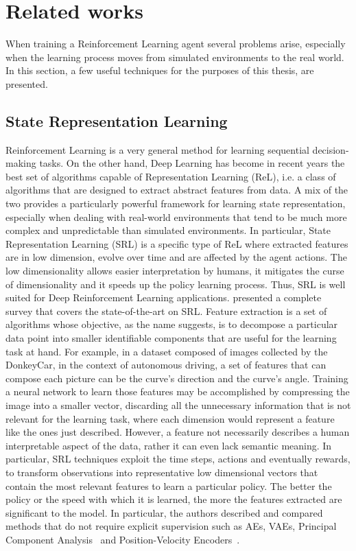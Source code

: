 \chapter{Related works}

When training a Reinforcement Learning agent several problems arise, especially when the learning process moves from simulated environments to the real world. In this section, a few useful techniques for the purposes of this thesis, are presented.

\section{State Representation Learning} \label{sec:srl}
Reinforcement Learning is a very general method for learning sequential decision-making tasks. On the other hand, Deep Learning has become in recent years the best set of algorithms capable of Representation Learning (ReL), i.e. a class of algorithms that are designed to extract abstract features from data. A mix of the two provides a particularly powerful framework for learning state representation, especially when dealing with real-world environments that tend to be much more complex and unpredictable than simulated environments. In particular, State Representation Learning (SRL) is a specific type of ReL where extracted features are in low dimension, evolve over time and are affected by the agent actions. The low dimensionality allows easier interpretation by humans, it mitigates the curse of dimensionality and it speeds up the policy learning process. Thus, SRL is well suited for Deep Reinforcement Learning applications. \citet{DBLP:journals/corr/abs-1802-04181} presented a complete survey that covers the state-of-the-art on SRL. Feature extraction is a set of algorithms whose objective, as the name suggests, is to decompose a particular data point into smaller identifiable components that are useful for the learning task at hand. For example, in a dataset composed of images collected by the DonkeyCar, in the context of autonomous driving, a set of features that can compose each picture can be the curve's direction and the curve's angle. Training a neural network to learn those features may be accomplished by compressing the image into a smaller vector, discarding all the unnecessary information that is not relevant for the learning task, where each dimension would represent a feature like the ones just described. However, a feature not necessarily describes a human interpretable aspect of the data, rather it can even lack semantic meaning. In particular, SRL techniques exploit the time steps, actions and eventually rewards, to transform observations into representative low dimensional vectors that contain the most relevant features to learn a particular policy. The better the policy or the speed with which it is learned, the more the features extracted are significant to the model. In particular, the authors described and compared methods that do not require explicit supervision such as AEs, VAEs, Principal Component Analysis~\citep{https://doi.org/10.48550/arxiv.1505.00322} and Position-Velocity Encoders~\citep{DBLP:journals/corr/JonschkowskiHSR17}.

